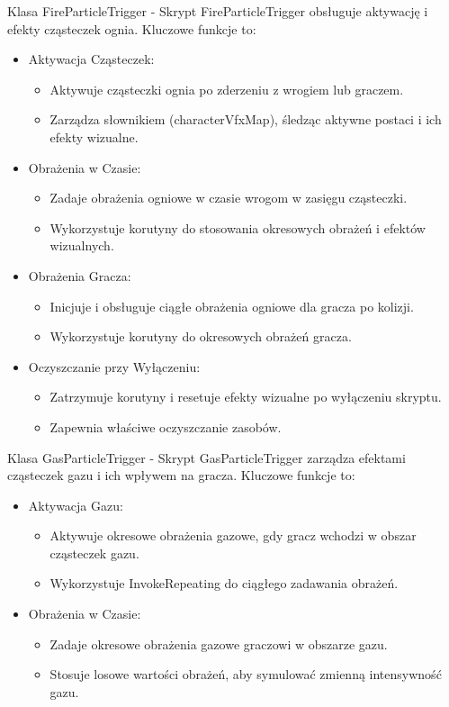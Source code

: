 Klasa FireParticleTrigger -
Skrypt FireParticleTrigger obsługuje aktywację i efekty cząsteczek ognia. Kluczowe funkcje to:
\begin{itemize}
\item Aktywacja Cząsteczek:
    \begin{itemize}
         \item Aktywuje cząsteczki ognia po zderzeniu z wrogiem lub graczem.
         \item Zarządza słownikiem (characterVfxMap), śledząc aktywne postaci i ich efekty wizualne.
    \end{itemize}
\item Obrażenia w Czasie:
    \begin{itemize}
         \item Zadaje obrażenia ogniowe w czasie wrogom w zasięgu cząsteczki.
         \item Wykorzystuje korutyny do stosowania okresowych obrażeń i efektów wizualnych.
    \end{itemize}
\item Obrażenia Gracza:
    \begin{itemize}
         \item Inicjuje i obsługuje ciągłe obrażenia ogniowe dla gracza po kolizji.
         \item Wykorzystuje korutyny do okresowych obrażeń gracza.
    \end{itemize}
\item Oczyszczanie przy Wyłączeniu:
    \begin{itemize}
        \item Zatrzymuje korutyny i resetuje efekty wizualne po wyłączeniu skryptu.
        \item Zapewnia właściwe oczyszczanie zasobów.
    \end{itemize}
\end{itemize}

Klasa GasParticleTrigger -
Skrypt GasParticleTrigger zarządza efektami cząsteczek gazu i ich wpływem na gracza. Kluczowe funkcje to:
\begin{itemize}
\item Aktywacja Gazu:
    \begin{itemize}
        \item Aktywuje okresowe obrażenia gazowe, gdy gracz wchodzi w obszar cząsteczek gazu.
        \item Wykorzystuje InvokeRepeating do ciągłego zadawania obrażeń.
    \end{itemize}
\item Obrażenia w Czasie:
    \begin{itemize}
        \item Zadaje okresowe obrażenia gazowe graczowi w obszarze gazu.
        \item Stosuje losowe wartości obrażeń, aby symulować zmienną intensywność gazu.
    \end{itemize}
\end{itemize}

